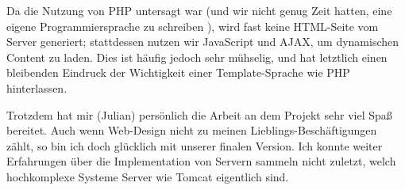 Da die Nutzung von PHP untersagt war
(und wir nicht genug Zeit hatten,
eine eigene Programmiersprache zu schreiben \smiley ),
wird fast keine HTML-Seite vom Server generiert;
stattdessen nutzen wir JavaScript und AJAX,
um dynamischen Content zu laden.
Dies ist häufig jedoch sehr mühselig,
und hat letztlich einen bleibenden Eindruck
der Wichtigkeit einer Template-Sprache wie PHP
hinterlassen.

Trotzdem hat mir (Julian) persönlich die Arbeit an dem Projekt sehr viel Spaß bereitet.
Auch wenn Web-Design nicht zu meinen Lieblings-Beschäftigungen zählt,
so bin ich doch glücklich mit unserer finalen Version.
Ich konnte weiter Erfahrungen über die Implementation von Servern sammeln \textemdash{}
nicht zuletzt, welch hochkomplexe Systeme Server wie Tomcat eigentlich sind.
